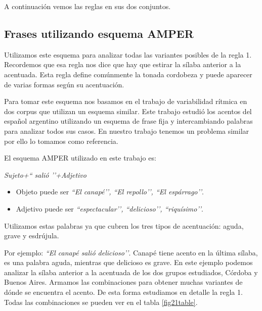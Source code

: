 A continuación vemos las reglas en sus dos conjuntos.

\subsection{Frases utilizando esquema AMPER} \label{cap:amper}


Utilizamos este esquema para analizar todas las variantes posibles de la regla 1. Recordemos que esa regla nos dice que hay que estirar la sílaba anterior a la acentuada. Esta regla define comúnmente la tonada cordobeza y puede aparecer de varias formas según su acentuación. 

Para tomar este esquema nos basamos en el trabajo de variabilidad rítmica en dos corpus \cite{amper} que utilizan un esquema similar. Este trabajo estudió los acentos del español argentino utilizando un esquema de frase fija y intercambiando palabras para analizar todos sus casos. En nuestro trabajo tenemos un problema similar por ello lo tomamos como referencia.

El esquema AMPER utilizado en este trabajo es: 
\begin{center}
\textit{Sujeto+`` salió ’’+Adjetivo} 
\end{center}

\begin{itemize}
	\item Objeto puede ser \textit{``El canapé’’, ``El repollo’’, ``El espárrago’’}.
	\item Adjetivo puede ser \textit{``espectacular’’, ``delicioso’’, ``riquísimo’’}.
\end{itemize}

Utilizamos estas palabras ya que cubren los tres tipos de acentuación: aguda, grave y esdrújula. 

Por ejemplo: \textit{``El canapé salió delicioso’’}. Canapé tiene acento en la última sílaba, es una palabra aguda, mientras que delicioso es grave. En este ejemplo podemos analizar la sílaba anterior a la acentuada de los dos grupos estudiados, Córdoba y Buenos Aires. Armamos las combinaciones para obtener muchas variantes de dónde se encuentra el acento. De esta forma estudiamos en detalle la regla 1. Todas las combinaciones se pueden ver en el tabla \ref{fig21table}.


